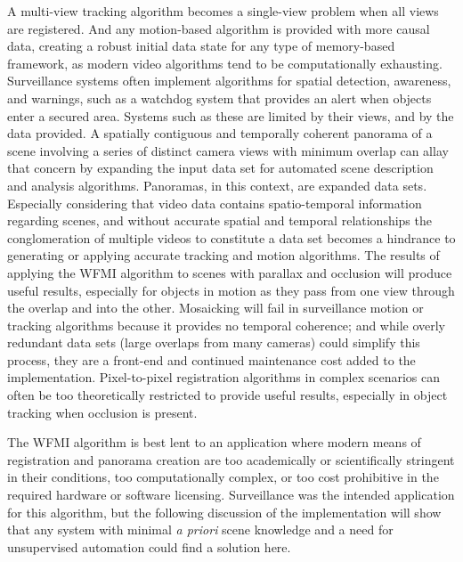 A multi-view tracking algorithm becomes a single-view problem when all views are registered. And any motion-based algorithm is provided with more causal data, creating a robust initial data state for any type of memory-based framework, as modern video algorithms tend to be computationally exhausting. Surveillance systems often implement algorithms for spatial detection, awareness, and warnings, such as a watchdog system that provides an alert when objects enter a secured area. Systems such as these are limited by their views, and by the data provided. A spatially contiguous and temporally coherent panorama of a scene involving a series of distinct camera views with minimum overlap can allay that concern by expanding the input data set for automated scene description and analysis algorithms. Panoramas, in this context, are expanded data sets. Especially considering that video data contains spatio-temporal information regarding scenes, and without accurate spatial and temporal relationships the conglomeration of multiple videos to constitute a data set becomes a hindrance to generating or applying accurate tracking and motion algorithms. The results of applying the WFMI algorithm to scenes with parallax and occlusion will produce useful results, especially for objects in motion as they pass from one view through the overlap and into the other. Mosaicking will fail in surveillance motion or tracking algorithms because it provides no temporal coherence; and while overly redundant data sets (large overlaps from many cameras) could simplify this process, they are a front-end and continued maintenance cost added to the implementation. Pixel-to-pixel registration algorithms in complex scenarios can often be too theoretically restricted to provide useful results, especially in object tracking when occlusion is present.

The WFMI algorithm is best lent to an application where modern means of registration and panorama creation are too academically or scientifically stringent in their conditions, too computationally complex, or too cost prohibitive in the required hardware or software licensing. Surveillance was the intended application for this algorithm, but the following discussion of the implementation will show that any system with minimal \textit{a priori} scene knowledge and a need for unsupervised automation could find a solution here.



